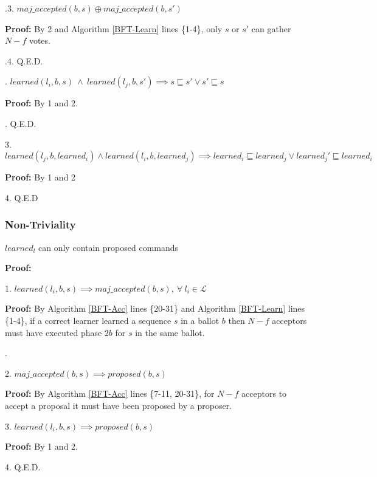 \indent\indent\indent\indent{}.3. $maj\_accepted(b,s) \oplus maj\_accepted(b,s')$ \par
\indent\indent\indent\indent\indent\indent \parbox{\linewidth}{\textbf{Proof:} By 2 and Algorithm \ref{BFT-Learn} lines \{1-4\}, only $s$ or $s'$ can gather $N-f$ votes.}\par
\indent\indent\indent\indent{}.4. Q.E.D. \par
\indent\indent{}. $learned(l_i,b,s)\ \land\ learned(l_j,b,s') \implies s \sqsubseteq s' \lor s' \sqsubseteq s$ \par
\indent\indent\indent\indent\textbf{Proof:} By 1 and 2.\par
\indent\indent{}. Q.E.D. \par
3. $learned(l_j,b,learned_i) \land learned(l_i,b,learned_j) \implies learned_i \sqsubseteq learned_j \lor learned_j' \sqsubseteq learned_i$ \par
\indent\indent\textbf{Proof:} By 1 and 2\par
4. Q.E.D \par

\subsubsection{Non-Triviality}
\begin{theorem}
$learned_l$ can only contain proposed commands \label{N-T1} \par
\end{theorem} 
\textbf{Proof:} \par
1. $learned(l_i,b,s) \implies maj\_accepted(b,s),\ \forall\ l_i \in \mathcal{L}$ \par
\indent\indent\parbox{\linewidth}{\textbf{Proof:} By Algorithm \ref{BFT-Acc} lines \{20-31\} and Algorithm \ref{BFT-Learn} lines \{1-4\}, if a correct learner learned a sequence $s$ in a ballot $b$ then $N-f$ acceptors must have executed phase $2b$ for $s$ in the same ballot.}. \par
2. $maj\_accepted(b,s) \implies proposed(b,s)$ \par
\indent\indent\textbf{Proof:} By Algorithm \ref{BFT-Acc} lines \{7-11, 20-31\}, for $N-f$ acceptors to accept a proposal it must have been proposed by a proposer.\par
3. $learned(l_i,b,s) \implies proposed(b,s)$ \par
\indent\indent\textbf{Proof:} By 1 and 2. \par
4. Q.E.D. \par

